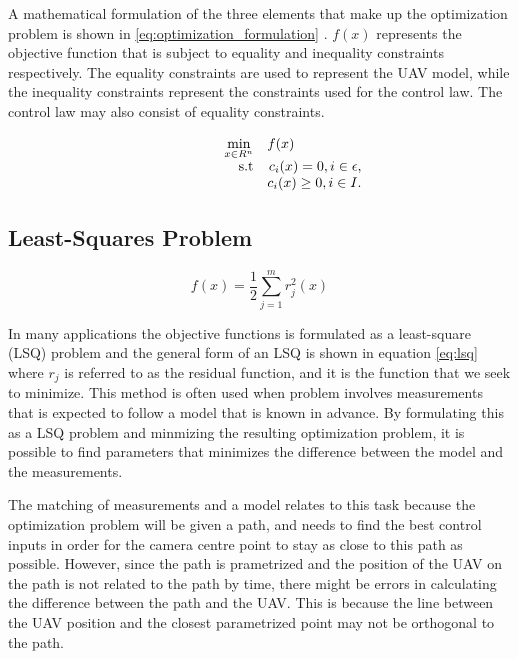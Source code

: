 A mathematical formulation of the three elements that make up the optimization problem is shown in \ref{eq:optimization_formulation} \cite{nocedalOPTIMIZATION}. $f(x)$ represents the objective function that is subject to equality and inequality constraints respectively. The equality constraints are used to represent the UAV model, while the inequality constraints represent the constraints used for the control law. The control law may also consist of equality constraints.

\begin{equation}
	\label{eq:optimization_formulation}
	\begin{array}{rrclcl}
		\displaystyle \min_{x \in R^n} & \multicolumn{3}{l}{f(x)} \\
		\textrm{s.t}
		& c_i(x) = 0, i \in \epsilon, \\
		& c_i(x) \geq 0, i \in I.
	\end{array}
\end{equation}

\subsection{Least-Squares Problem}

\begin{equation}
	\label{eq:lsq}
	f(x) = \frac{1}{2} \sum_{j=1}^m r_j^2(x)
\end{equation}

In many applications the objective functions is formulated as a least-square (LSQ) problem and the general form of an LSQ is shown in equation \ref{eq:lsq} \cite{nocedalOPTIMIZATION} where $r_j$ is referred to as the residual function, and it is the function that we seek to minimize. This method is often used when problem involves measurements that is expected to follow a model that is known in advance. By formulating this as a LSQ problem and minmizing the resulting optimization problem, it is possible to find parameters that minimizes the difference between the model and the measurements. 

The matching of measurements and a model relates to this task because the optimization problem will be given a path, and needs to find the best control inputs in order for the camera centre point to stay as close to this path as possible. However, since the path is prametrized and the position of the UAV on the path is not related to the path by time, there might be errors in calculating the difference between the path and the UAV. This is because the line between the UAV position and the closest parametrized point may not be orthogonal to the path.

